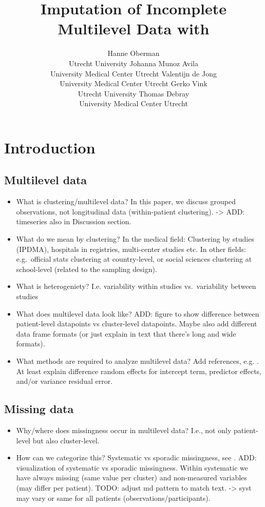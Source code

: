 \documentclass[
]{jss}
\author{
Hanne Oberman\\Utrecht University \And Johanna Munoz Avila\\University
Medical Center Utrecht \AND Valentijn de Jong\\University Medical
Center Utrecht \And Gerko Vink\\Utrecht University \AND Thomas
Debray\\University Medical Center Utrecht
}
\title{Imputation of Incomplete Multilevel Data with \pkg{mice}}
\begin{document}
\hypertarget{introduction}{%
\section{Introduction}\label{introduction}}

\hypertarget{multilevel-data}{%
\subsection{Multilevel data}\label{multilevel-data}}

\begin{itemize}
\item
  What is clustering/multilevel data? In this paper, we discuss grouped
  observations, not longitudinal data (within-patient clustering).
  -\textgreater{} ADD: timeseries also in Discussion section.
\item
  What do we mean by clustering? In the medical field: Clustering by
  studies (IPDMA), hospitals in registries, multi-center studies etc. In
  other fields: e.g.~official stats clustering at country-level, or
  social sciences clustering at school-level (related to the sampling
  design).
\item
  What is heterogeniety? I.e. variability within studies vs.~variability
  between studies
\item
  What does multilevel data look like? ADD: figure to show difference
  between patient-level datapoints vs cluster-level datapoints. Maybe
  also add different data frame formats (or just explain in text that
  there's long and wide formats).
\item
  What methods are required to analyze multilevel data? Add references,
  e.g. \citet{hox17}. At least explain difference random effects for
  intercept term, predictor effects, and/or variance residual error.
\end{itemize}

\hypertarget{missing-data}{%
\subsection{Missing data}\label{missing-data}}

\begin{itemize}
\item
  Why/where does missingness occur in multilevel data? I.e., not only
  patient-level but also cluster-level.
\item
  How can we categorize this? Systematic vs sporadic missingness, see
  \citet{resc13}. ADD: visualization of systematic vs sporadic
  missingness. Within systematic we have always missing (same value per
  cluster) and non-measured variables (may differ per patient). TODO:
  adjust md pattern to match text. -\textgreater{} syst may vary or same
  for all patients (observations/participants).
\end{itemize}
\end{document}
